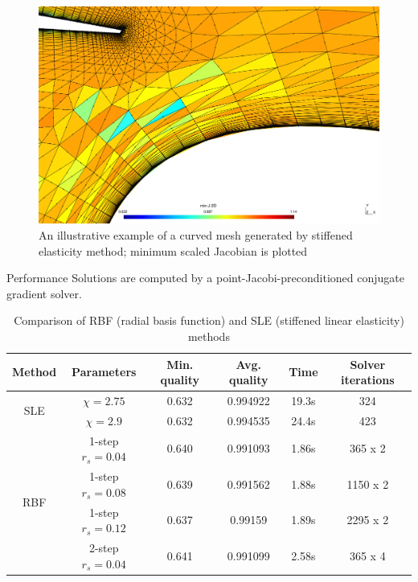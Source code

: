 \documentclass[t,12pt]{beamer}
\begin{document}
\begin{frame}
\begin{figure}
	\centering
	\includegraphics[scale=0.2]{3comp-stiffelast-zoomed}
	\caption{An illustrative example of a curved mesh generated by stiffened elasticity method; minimum scaled Jacobian is plotted}
	\label{fig:3compstiffelast}
\end{figure}
\end{frame}

\begin{frame}{Performance}
	\fontsize{8pt}{10}\selectfont
	Solutions are computed by a point-Jacobi-preconditioned conjugate gradient solver.
	\begin{table}
		\begin{tabular}{|c|c|c|c|c|c|}
			\hline
			Method & Parameters & Min. quality & Avg. quality & Time & Solver iterations \\
			\hline
			\multirow{2}{0.5in}{SLE} & $\chi=2.75$ & 0.632 & 0.994922 & 19.3s & 324 \\
			& $\chi=2.9$ & 0.632 & 0.994535 & 24.4s & 423 \\
			\hline
			\multirow{4}{0.5in}{RBF} & 1-step $r_s=0.04$ & 0.640 & 0.991093 & 1.86s & 365 x 2 \\
			&   1-step $r_s=0.08$ & 0.639 & 0.991562 & 1.88s & 1150 x 2\\
			&   1-step $r_s=0.12$ & 0.637 & 0.99159  & 1.89s & 2295 x 2 \\
			&   2-step $r_s=0.04$ & 0.641 & 0.991099 & 2.58s & 365 x 4\\
			\hline
		\end{tabular}
		\caption{Comparison of RBF (radial basis function) and SLE (stiffened linear elasticity) methods}
		\label{tab:rbfelast}
	\end{table}
\end{frame}
\end{document}
